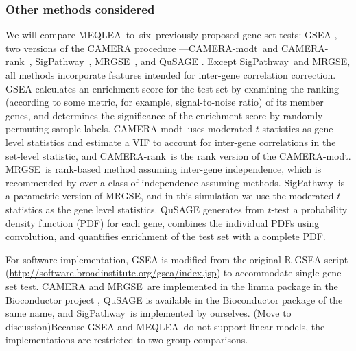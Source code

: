 \documentclass[a4,center,fleqn]{NAR}
\newcommand{\OurMethod}{MEQLEA}
\newcommand{\HowmanyTest}{six}
\newcommand{\CMR}{CAMERA-rank}
\newcommand{\CMT}{CAMERA-modt}
\newcommand{\gent}{SigPathway}
\newcommand{\genr}{MRGSE}
\begin{document}
	
	\subsubsection{Other methods considered}
	
	We will compare \OurMethod~to~\HowmanyTest~previously proposed gene set tests: GSEA
	\citep{subramanian2005gene}, two versions of the CAMERA procedure ---\CMT~and
	\CMR~\citep{wu2012camera}, \gent~\citep{tian2005discovering}, \genr~\citep{michaud2008integrative},
	and QuSAGE \citep{yaari2013quantitative}. Except \gent~and \genr, all methods incorporate features intended for inter-gene correlation correction. GSEA calculates an enrichment score for the test set by examining the ranking (according to some metric, for example, signal-to-noise ratio) of its member genes, and determines the significance of the enrichment score by randomly permuting sample labels. \CMT~uses moderated $t$-statistics \citep{Smyth2004moderated} as gene-level statistics and estimate a VIF to account for inter-gene correlations in the set-level statistic, and \CMR~is the rank version of the \CMT.
	\genr~is rank-based method assuming inter-gene independence, which is recommended by \cite{tarca2013comparison} over a class of independence-assuming methods. \gent~is a parametric version of \genr, and in this simulation we use the moderated $t$-statistics as the gene level statistics. 
	QuSAGE generates
	from $t$-test a probability density function (PDF) for each gene, combines the individual PDFs using
	convolution, and quantifies enrichment of the test set with a complete PDF. 
	
	
	For software implementation, GSEA is modified from the original R-GSEA script
	(\url{http://software.broadinstitute.org/gsea/index.jsp}) to accommodate single gene set test.
	CAMERA and \genr~are implemented in the limma package \citep{smyth2005limma} in the Bioconductor
	project \citep{gentleman2004bioconductor}, QuSAGE is available in the Bioconductor package of the
	same name, and \gent~is implemented by ourselves. (Move to discussion)Because GSEA and \OurMethod~do not support linear models, the implementations are restricted to two-group comparisons.
	
\end{document}
